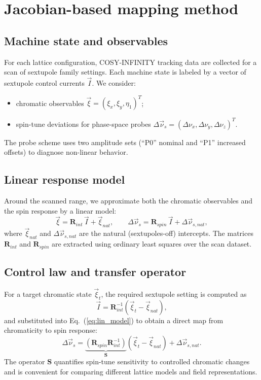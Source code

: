 \documentclass[a4paper,
               keeplastbox,   %
               ]{jacow}
\begin{document}
\section{Jacobian-based mapping method}
\subsection{Machine state and observables}
\par For each lattice configuration, COSY-INFINITY tracking data are collected for a scan of sextupole family settings. Each machine state is labeled by a vector of sextupole control currents \(\vec I\). We consider:
\begin{itemize}
	\item chromatic observables \(\vec\xi = (\xi_x,\xi_y,\eta_1)^T\);
	\item spin-tune deviations for phase-space probes \(\Delta\vec\nu_s=(\Delta\nu_x,\Delta\nu_y,\Delta\nu_z)^T\).
\end{itemize}
The probe scheme uses two amplitude sets (``P0'' nominal and ``P1'' increased offsets) to diagnose non-linear behavior.

\subsection{Linear response model}
\par Around the scanned range, we approximate both the chromatic observables and the spin response by a linear model:
\begin{equation}
	\vec\xi = \mathbf{R}_{int}\,\vec I + \vec\xi_{nat},\qquad
	\Delta\vec\nu_s = \mathbf{R}_{spin}\,\vec I + \Delta\vec\nu_{s,nat},
	\label{eq:lin_model}
\end{equation}
\noindent where \(\vec\xi_{nat}\) and \(\Delta\vec\nu_{s,nat}\) are the natural (sextupoles-off) intercepts. The matrices \(\mathbf{R}_{int}\) and \(\mathbf{R}_{spin}\) are extracted using ordinary least squares over the scan dataset.

\subsection{Control law and transfer operator}
\par For a target chromatic state \(\vec\xi_{t}\), the required sextupole setting is computed as
\begin{equation}
	\vec I = \mathbf{R}_{int}^{-1}\left(\vec\xi_{t}-\vec\xi_{nat}\right),
	\label{eq:control_law}
\end{equation}
\noindent and substituted into Eq.~(\ref{eq:lin_model}) to obtain a direct map from chromaticity to spin response:
\begin{equation}
	\Delta\vec\nu_s
	= \underbrace{\left(\mathbf{R}_{spin}\mathbf{R}_{int}^{-1}\right)}_{\mathbf{S}}
	\left(\vec\xi_{t}-\vec\xi_{nat}\right)+\Delta\vec\nu_{s,nat}.
	\label{eq:transfer}
\end{equation}
\noindent The operator \(\mathbf{S}\) quantifies spin-tune sensitivity to controlled chromatic changes and is convenient for comparing different lattice models and field representations.
\end{document}

